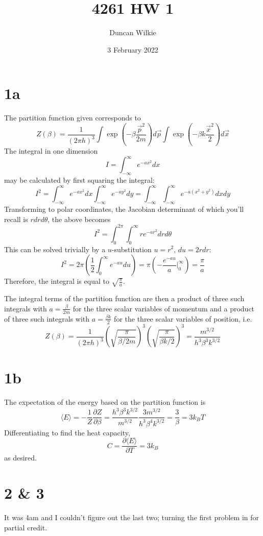 \documentclass{article}
\title{4261 HW 1}
\author{Duncan Wilkie}
\date{3 February 2022}
\begin{document}
\maketitle

\section*{1a}
The partition function given corresponds to
\[Z(\beta)=\frac{1}{(2\pi h)^3}\int \exp\left( -\beta\frac{\vec{p}^2}{2m} \right)d\vec{p}\int \exp\left( -\beta k\frac{\vec{x}^2}{2} \right)d\vec{x}\]
The integral in one dimension
\[I=\int_{-\infty}^\infty e^{-ax^2}dx\]
may be calculated by first squaring the integral:
\[I^2=\int_{-\infty}^\infty e^{-ax^2}dx\int_{-\infty}^\infty e^{-ay^2}dy=\int_{-\infty}^\infty\int_{-\infty}^\infty e^{-a(x^2+y^2)}dxdy\]
Transforming to polar coordinates, the Jacobian determinant of which you'll recall is $rdrd\theta$, the above becomes
\[I^2=\int_{0}^{2\pi}\int_0^\infty re^{-ar^2}drd\theta\]
This can be solved trivially by a $u$-substitution $u=r^2$, $du=2rdr$:
\[I^2=2\pi\left( \frac{1}{2}\int_0^\infty e^{-au}du\right)=\pi\left( -\frac{e^{-au}}{a}\bigg|_0^\infty \right)=\frac{\pi}{a}\]
Therefore, the integral is equal to $\sqrt{\frac{\pi}{a}}$.

The integral terms of the partition function are then a product of three such integrals with $a=\frac{\beta}{2m}$ for the three scalar variables of momentum and a product of three such integrals with $a=\frac{\beta k}{2}$ for the three scalar variables of position, i.e.
\[Z(\beta)=\frac{1}{(2\pi h)^3}\left( \sqrt{\frac{\pi}{\beta/2m}} \right)^3\left( \sqrt{\frac{\pi}{\beta k/2}} \right)^3=\frac{m^{3/2}}{h^3\beta^3k^{3/2}}\]

\section*{1b}
The expectation of the energy based on the partition function is
\[\langle E \rangle=-\frac{1}{Z}\frac{\partial Z}{\partial \beta}=\frac{h^3\beta^3k^{3/2}}{m^{3/2}}\frac{3m^{3/2}}{h^3\beta^4k^{3/2}}=\frac{3}{\beta}=3k_BT\]
Differentiating to find the heat capacity,
\[C=\frac{\partial \langle E \rangle}{\partial T}=3k_B\]
as desired.

\section*{2 \& 3}
It was 4am and I couldn't figure out the last two; turning the first problem in for partial credit.
\end{document}
